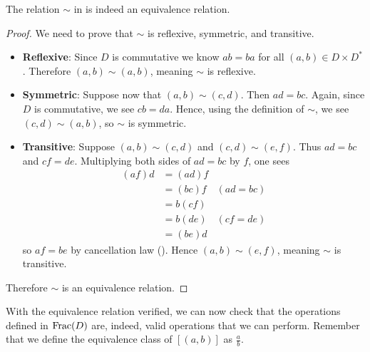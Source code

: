 \begin{proposition}
    The relation $\sim$ in  is indeed an equivalence relation.
\end{proposition}
\begin{proof}
    We need to prove that $\sim$ is reflexive, symmetric, and transitive.
    \begin{itemize}
        \item \textbf{Reflexive}: Since $D$ is commutative we know $ab = ba$ for all $(a,b) \in D \times D^\ast$. Therefore $(a, b) \mathrel{\sim} (a, b)$, meaning $\sim$ is reflexive.

        \item \textbf{Symmetric}: Suppose now that $(a,b)\mathrel{\sim}(c,d)$. Then $ad = bc$. Again, since $D$ is commutative, we see $cb = da$. Hence, using the definition of $\sim$, we see $(c,d)\mathrel{\sim}(a,b)$, so $\sim$ is symmetric.

        \item \textbf{Transitive}: Suppose $(a,b)\mathrel{\sim}(c,d)$ and $(c,d)\mathrel{\sim}(e,f)$. Thus $ad = bc$ and $cf = de$. Multiplying both sides of $ad = bc$ by $f$, one sees
        \begin{align*}
            (af)d &= (ad)f\\
            &= (bc)f & (ad = bc)\\
            &= b(cf)\\
            &= b(de) & (cf = de)\\
            &= (be)d
        \end{align*}
        so $af = be$ by cancellation law (). Hence $(a,b)\mathrel{\sim}(e,f)$, meaning $\sim$ is transitive.
    \end{itemize}
    Therefore $\sim$ is an equivalence relation.
\end{proof}

With the equivalence relation verified, we can now check that the operations defined in $\mathrm{Frac}(D)$ are, indeed, valid operations that we can perform. Remember that we define the equivalence class of $[(a, b)]$ as $\frac ab$.


